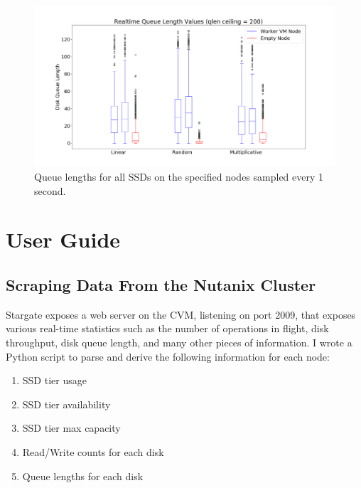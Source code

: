 \documentclass[12pt]{article}
\begin{document}
  \begin{figure}[!htb]
    \centering
    \includegraphics[scale=0.32]{images/qlen_200_box.png} 
    \caption{Queue lengths for all SSDs on the specified nodes sampled every 1
             second.}
    \label{fig:qlen_200}
  \end{figure}

\newpage
\FloatBarrier
\section{User Guide}

  \subsection{Scraping Data From the Nutanix Cluster}

  Stargate exposes a web server on the CVM, listening on port 2009, that
  exposes various real-time statistics such as the number of operations in flight,
  disk throughput, disk queue length, and many other pieces of information. I
  wrote a Python script to parse and derive the following information for each
  node:

  \begin{tcolorbox}
  \begin{enumerate}
    \item SSD tier usage
    \item SSD tier availability
    \item SSD tier max capacity
    \item Read/Write counts for each disk
    \item Queue lengths for each disk
  \end{enumerate}
  \end{tcolorbox}
\end{document}
